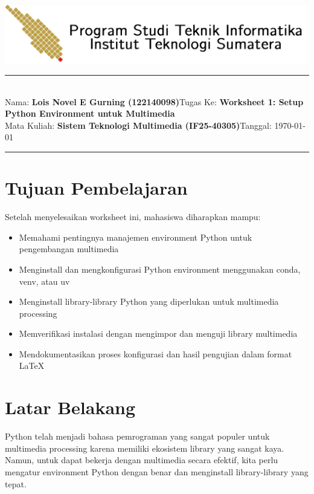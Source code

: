 \documentclass[11pt,a4paper]{article}
\newcommand{\student}{\textbf{Lois Novel E Gurning (122140098)}}
\newcommand{\course}{\textbf{Sistem Teknologi Multimedia (IF25-40305)}}
\newcommand{\assignment}{\textbf{Worksheet 1: Setup Python Environment untuk Multimedia}}
\begin{document}
\thispagestyle{empty}
\begin{center}
	\includegraphics[scale = 0.15]{Figure/ifitera-header.png}
	\vspace{0.1cm}
\end{center}
\noindent
\rule{17cm}{0.2cm}\\[0.3cm]
Nama: \student \hfill Tugas Ke: \assignment\\[0.1cm]
Mata Kuliah: \course \hfill Tanggal: \today\\
\rule{17cm}{0.05cm}
\vspace{0.1cm}



\section{Tujuan Pembelajaran}
Setelah menyelesaikan worksheet ini, mahasiswa diharapkan mampu:
\begin{itemize}
    \item Memahami pentingnya manajemen environment Python untuk pengembangan multimedia
    \item Menginstall dan mengkonfigurasi Python environment menggunakan conda, venv, atau uv
    \item Menginstall library-library Python yang diperlukan untuk multimedia processing
    \item Memverifikasi instalasi dengan mengimpor dan menguji library multimedia
    \item Mendokumentasikan proses konfigurasi dan hasil pengujian dalam format \LaTeX
\end{itemize}

\section{Latar Belakang}
Python telah menjadi bahasa pemrograman yang sangat populer untuk multimedia processing karena memiliki ekosistem library yang sangat kaya. Namun, untuk dapat bekerja dengan multimedia secara efektif, kita perlu mengatur environment Python dengan benar dan menginstall library-library yang tepat.
\end{document}

